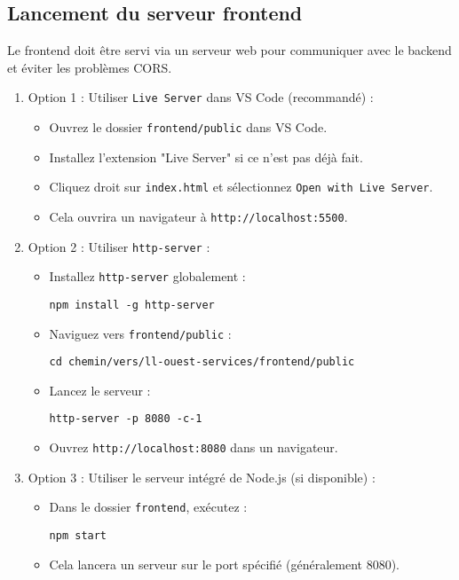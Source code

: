 \documentclass[12pt, a4paper]{article}
\begin{document}
\subsection{Lancement du serveur frontend}
\begin{stepbox}
Le frontend doit être servi via un serveur web pour communiquer avec le backend et éviter les problèmes CORS.

\begin{enumerate}
  \item Option 1 : Utiliser \texttt{Live Server} dans VS Code (recommandé) :
  \begin{itemize}
    \item Ouvrez le dossier \texttt{frontend/public} dans VS Code.
    \item Installez l'extension "Live Server" si ce n'est pas déjà fait.
    \item Cliquez droit sur \texttt{index.html} et sélectionnez \texttt{Open with Live Server}.
    \item Cela ouvrira un navigateur à \texttt{http://localhost:5500}.
  \end{itemize}
  \item Option 2 : Utiliser \texttt{http-server} :
  \begin{itemize}
    \item Installez \texttt{http-server} globalement :
    \begin{lstlisting}
npm install -g http-server
    \end{lstlisting}
    \item Naviguez vers \texttt{frontend/public} :
    \begin{lstlisting}
cd chemin/vers/ll-ouest-services/frontend/public
    \end{lstlisting}
    \item Lancez le serveur :
    \begin{lstlisting}
http-server -p 8080 -c-1
    \end{lstlisting}
    \item Ouvrez \texttt{http://localhost:8080} dans un navigateur.
  \end{itemize}
  \item Option 3 : Utiliser le serveur intégré de Node.js (si disponible) :
  \begin{itemize}
    \item Dans le dossier \texttt{frontend}, exécutez :
    \begin{lstlisting}
npm start
    \end{lstlisting}
    \item Cela lancera un serveur sur le port spécifié (généralement 8080).
  \end{itemize}
\end{enumerate}
\end{stepbox}
\end{document}
